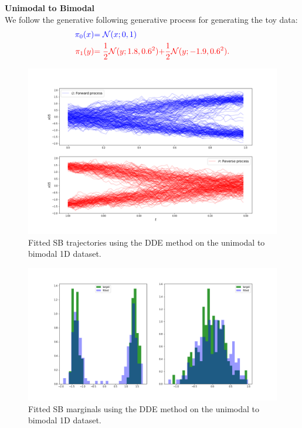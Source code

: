 \documentclass[a4paper,12pt,twoside,openright]{report}
\theoremstyle{definition}
\begin{document}
\textbf{Unimodal to Bimodal}\\
We follow the generative following generative process for generating the toy data:
\begin{align*}
     \color{blue}{\pi_0(x)} &\color{blue}{= {\mathcal{N}}(x; 0,  1)} \\
    \color{red}{\pi_1(y)} &\color{red}{= \frac{1}{2}{\mathcal{N}}(y; 1.8, 0.6 ^2)}\color{red}{ + \frac{1}{2}{\mathcal{N}}(y; -1.9, 0.6 ^2) }.
\end{align*}
\begin{figure}
    \centering
    \includegraphics[scale=0.4,trim={2.3cm 1cm 2.5cm 0}, clip]{images/GP/gp_final_bimodal_trajectories.png}
    \caption{ Fitted SB trajectories using the DDE method on the unimodal to bimodal 1D dataset.  }
    \label{fig:bimodfinal200trajectories}
\end{figure}
\begin{figure}
    \centering
    \includegraphics[scale=0.3,trim={4cm 1cm 2.5cm 0}, clip]{images/GP/gp_2_mode_final_boundaires.png}
    \caption{ Fitted SB marginals using the DDE method on the unimodal to bimodal 1D dataset.  }
    \label{fig:bimodfinal200boundaries}
\end{figure}
\end{document}
